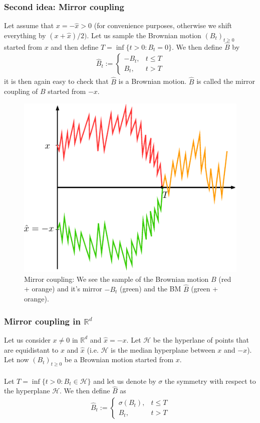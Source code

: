 \documentclass[../mainfile.tex]{subfiles}
\begin{document}
\subsubsection{Second idea: Mirror coupling}
Let assume that $x=-\hat{x}>0$ (for convenience purposes, otherwise we shift everything by $(x+\hat{x})/2)$. Let us sample the Brownian motion $(B_t)_{t \geq 0}$ started from $x$ and then define $T= \inf \{ t >0 : B_t =0 \}$. We then define $\hat{B}$ by 
\begin{align*}
\hat{B}_t := \begin{cases} -B_t , & t \leq T \\ B_t, & t > T \end{cases}
\end{align*}
it is then again easy to check that $\hat{B}$ is a Brownian motion. $\hat{B}$ is called the mirror coupling of $B$ started from $-x$. 
\begin{figure}[hbtp]
\centering
\includegraphics[scale=.9]{mirrorcoupling.pdf}
\caption{Mirror coupling: We see the sample of the Brownian motion $B$ (red + orange) and it's mirror $-B_t$ (green) and the BM $\hat{B}$ (green + orange).}
\end{figure}
\subsubsection{Mirror coupling in $\mathbb{R}^d$}
Let us consider $x \neq 0$ in $\mathbb{R}^d $ and $\hat{x}=-x$. Let $\mathcal{H}$ be the hyperlane of points that are equidistant to $x$ and $\hat{x}$ (i.e. $\mathcal{H}$ is the median hyperplane between $x$ and $-x$). Let now $(B_t)_{t \geq 0}$ be a Brownian motion started from $x$. \\\\
 Let $T = \inf \{ t >0 : B_t \in \mathcal{H}\}$ and let us denote by $\sigma$ the symmetry with respect to the hyperplane $\mathcal{H}$. We then define $\hat{B}$ as
 \begin{align*}
 \hat{B}_t := \begin{cases} \sigma(B_t), & t \leq T \\
 B_t, & t > T \end{cases}
 \end{align*}
 \newpage
\end{document}
